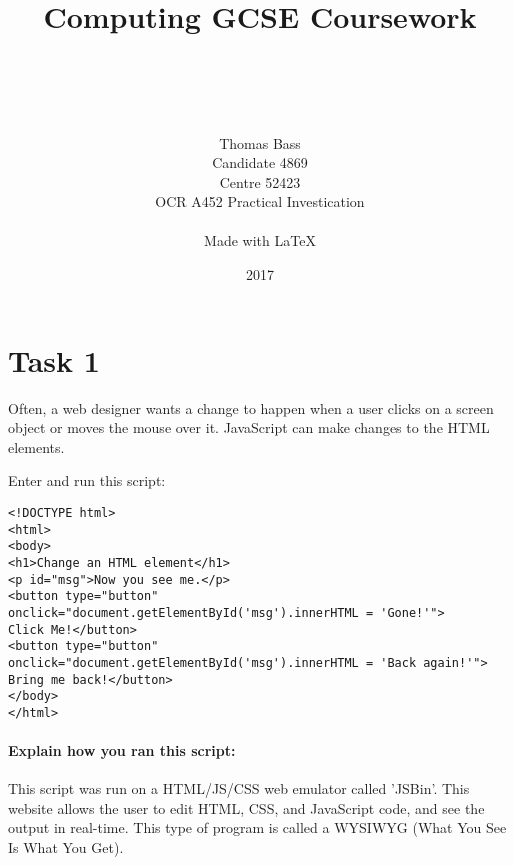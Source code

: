 \documentclass[a4paper]{article}
\title{Computing GCSE Coursework}
\author{\\ \\ \\ \\ Thomas Bass\\Candidate 4869\\Centre 52423\\OCR A452 Practical Investication\\\\Made with \LaTeX}
\date{2017}
\begin{document}
\maketitle
\pagebreak
\renewcommand*\contentsname{Summary}
\tableofcontents
\pagebreak


\section{Task 1}
Often, a web designer wants a change to happen when a user clicks on a screen object or moves the mouse over it. JavaScript can make changes to the HTML elements. \par
\noindent Enter and run this script: \par \par
\begin{lstlisting}
<!DOCTYPE html>
<html>
<body>
<h1>Change an HTML element</h1>
<p id="msg">Now you see me.</p>
<button type="button"
onclick="document.getElementById('msg').innerHTML = 'Gone!'">
Click Me!</button>
<button type="button"
onclick="document.getElementById('msg').innerHTML = 'Back again!'">
Bring me back!</button>
</body>
</html>
\end{lstlisting}


\paragraph{Explain how you ran this script:}

This script was run on a HTML/JS/CSS web emulator called 'JSBin'. This website allows the user to edit HTML, CSS, and JavaScript code, and see the output in real-time. This type of program is called a WYSIWYG (What You See Is What You Get).
\end{document}
